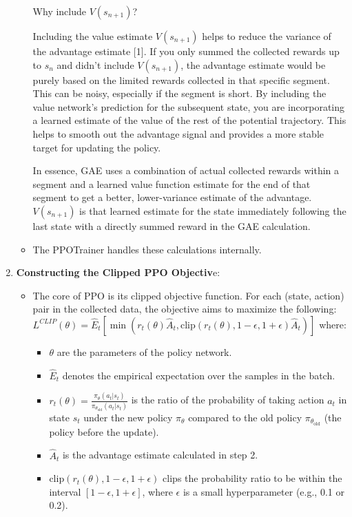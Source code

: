 \documentclass[10pt,a4paper]{report}
\begin{document}
\begin{enumerate}
\begin{itemize}
Why include $V(s_{n+1})$?

Including the value estimate $V(s_{n+1})$ helps to reduce the variance of the advantage estimate [1].
    If you only summed the collected rewards up to $s_n$ and didn't include $V(s_{n+1})$, the advantage estimate would be purely based on the limited rewards collected in that specific segment. This can be noisy, especially if the segment is short.
    By including the value network's prediction for the subsequent state, you are incorporating a learned estimate of the value of the rest of the potential trajectory. This helps to smooth out the advantage signal and provides a more stable target for updating the policy.

In essence, GAE uses a combination of actual collected rewards within a segment and a learned value function estimate for the end of that segment to get a better, lower-variance estimate of the advantage. $V(s_{n+1})$ is that learned estimate for the state immediately following the last state with a directly summed reward in the GAE calculation.
\item         The PPOTrainer handles these calculations internally.
\end{itemize}

\item   \textbf{Constructing the Clipped PPO Objectiv}e:
\begin{itemize}
\item         The core of PPO is its clipped objective function. For each (state, action) pair in the collected data, the objective aims to maximize the following: $L^{CLIP}(\theta) = \hat{E}_t [\min(r_t(\theta) \hat{A}_t, \text{clip}(r_t(\theta), 1-\epsilon, 1+\epsilon) \hat{A}_t)]$ where:
\begin{itemize}
\item             $\theta$ are the parameters of the policy network.
\item             $\hat{E}_t$ denotes the empirical expectation over the samples in the batch.
\item             $r_t(\theta) = \frac{\pi_\theta(a_t|s_t)}{\pi_{\theta_{\text{old}}}(a_t|s_t)}$ is the ratio of the probability of taking action $a_t$ in state $s_t$ under the new policy $\pi_\theta$ compared to the old policy $\pi_{\theta_{\text{old}}}$ (the policy before the update).
\item             $\hat{A}_t$ is the advantage estimate calculated in step 2.
 \item            $\text{clip}(r_t(\theta), 1-\epsilon, 1+\epsilon)$ clips the probability ratio to be within the interval $[1-\epsilon, 1+\epsilon]$, where $\epsilon$ is a small hyperparameter (e.g., 0.1 or 0.2).
\end{itemize}


\end{itemize}
\end{enumerate}
\end{document}
